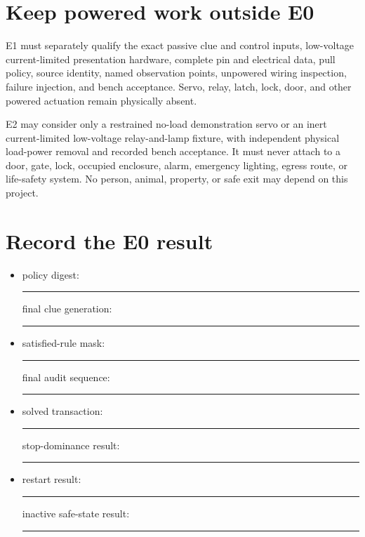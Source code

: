 \documentclass[10pt]{article}
\newcommand{\blankline}{\rule{0.72in}{0.4pt}}
\begin{document}
\section{Keep powered work outside E0}
E1 must separately qualify the exact passive clue and control inputs,
low-voltage current-limited presentation hardware, complete pin and electrical
data, pull policy, source identity, named observation points, unpowered wiring
inspection, failure injection, and bench acceptance. Servo, relay, latch,
lock, door, and other powered actuation remain physically absent.

E2 may consider only a restrained no-load demonstration servo or an inert
current-limited low-voltage relay-and-lamp fixture, with independent physical
load-power removal and recorded bench acceptance. It must never attach to a
door, gate, lock, occupied enclosure, alarm, emergency lighting, egress route,
or life-safety system. No person, animal, property, or safe exit may depend on
this project.

\section{Record the E0 result}
\begin{itemize}
 \item policy digest: \blankline\quad final clue generation: \blankline
 \item satisfied-rule mask: \blankline\quad final audit sequence: \blankline
 \item solved transaction: \blankline\quad stop-dominance result: \blankline
 \item restart result: \blankline\quad inactive safe-state result: \blankline
\end{itemize}
\end{document}
